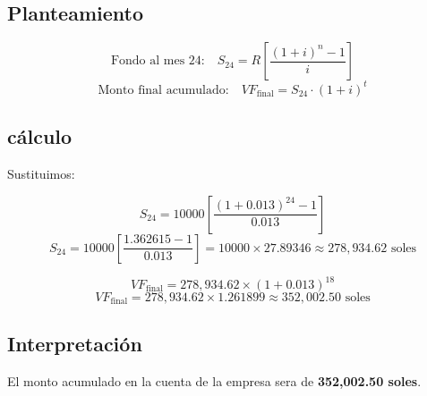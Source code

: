 \documentclass[12pt,a4paper]{article}
\begin{document}
	\subsection*{Planteamiento}

	$$\text{Fondo al mes 24:} \quad S_{24} = R \left[ \frac{(1 + i)^n - 1}{i} \right]$$
	$$\text{Monto final acumulado:} \quad VF_{\text{final}} = S_{24} \cdot (1 + i)^t$$
	
	\subsection*{cálculo }
	Sustituimos:
	
	$$S_{24} = 10000 \left[ \frac{(1 + 0.013)^{24} - 1}{0.013} \right]$$
	$$S_{24} = 10000 \left[ \frac{1.362615 - 1}{0.013} \right] = 10000 \times 27.89346 \approx 278,934.62 \text{ soles}$$
	
	
	$$VF_{\text{final}} = 278,934.62 \times (1 + 0.013)^{18}$$
	$$VF_{\text{final}} = 278,934.62 \times 1.261899 \approx 352,002.50 \text{ soles}$$
	
	\subsection*{Interpretación}
	El monto  acumulado en la cuenta de la empresa sera de \textbf{352,002.50 soles}.
	
	
\end{document}

